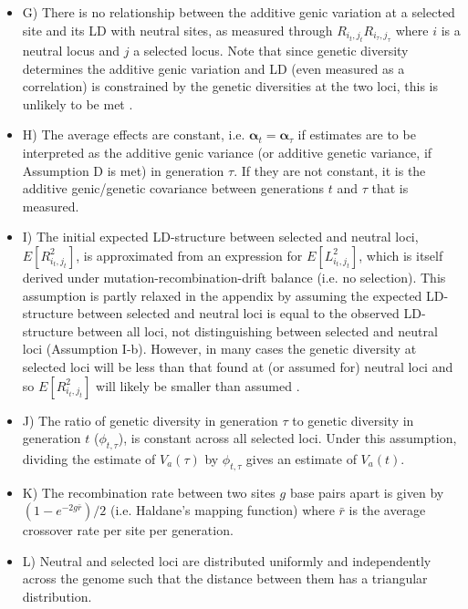 \documentclass[12pt]{article}
\begin{document}
\begin{bibunit}
\begin{itemize}
\item G)  There is no relationship between the additive genic variation at a selected site and its LD with neutral sites, as measured through $R_{i_t, j_t}R_{i_\tau, j_\tau}$ where $i$ is a neutral locus and $j$ a selected locus. Note that since genetic diversity determines the additive genic variation and LD (even measured as a correlation) is constrained by the genetic diversities at the two loci, this is unlikely to be met \citep{sved2018one}.

\item H) The average effects are constant, i.e. $\boldsymbol{\alpha}_t=\boldsymbol{\alpha}_{\tau}$ if estimates are to be interpreted as the additive genic variance (or additive genetic variance, if Assumption D is met) in generation $\tau$. If they are not constant, it is the additive genic/genetic covariance between generations $t$ and $\tau$ that is measured.  

\item I) The initial expected LD-structure between selected and neutral loci, $E[R_{i_t, j_t}^2]$, is approximated from an expression for $E[L_{i_t, j_t}^2]$, which is itself derived under mutation-recombination-drift balance (i.e. no selection). This assumption is partly relaxed in the appendix by assuming the expected LD-structure between selected and neutral loci is equal to the observed LD-structure between all loci, not distinguishing between selected and neutral loci (Assumption I-b). However, in many cases the genetic diversity at selected loci will be less than that found at (or assumed for) neutral loci and so $E[R_{i_t, j_t}^2]$ will likely be smaller than assumed \citep{sved2018one}.

\item J) The ratio of genetic diversity in generation $\tau$ to genetic diversity in generation $t$ ($\phi_{t,\tau}$), is constant across all selected loci. Under this assumption, dividing the estimate of $V_a(\tau)$ by $\phi_{t,\tau}$ gives an estimate of $V_a(t)$.

\item K) The recombination rate between two sites $g$ base pairs apart is given by $(1 - e^{-2g\bar{r}})/2$ (i.e. Haldane's \citeyearpar{haldane1919map} mapping function) where $\bar{r}$ is the average crossover rate per site per generation. 

\item L) Neutral and selected loci are distributed uniformly and independently across the genome such that the distance between them has a triangular distribution. 


\end{itemize}
\end{bibunit}
\end{document}
